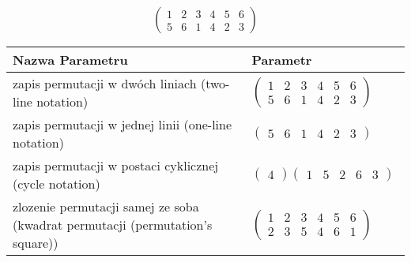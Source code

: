 \documentclass[12pt]{article}
\begin{document}
\subsection{}
\begin{center}
\[
\begin{pmatrix}
	1 & 2 & 3 & 4 & 5 & 6 \\ 
	5 & 6 & 1 & 4 & 2 & 3 
\end{pmatrix}
\]

\begin{tabular}{|m{0.6\linewidth}|m{0.4\linewidth}|}
	\hline
	Nazwa Parametru & Parametr \\
	\hline
	zapis permutacji w dwóch liniach (two-line notation) & $\begin{pmatrix} 1 & 2 & 3 & 4 & 5 & 6 \\ 
5 & 6 & 1 & 4 & 2 & 3 \end{pmatrix}$ \\ 
	\hline
	zapis permutacji w jednej linii (one-line notation) & $\begin{pmatrix} 5 & 6 & 1 & 4 & 2 & 3 \end{pmatrix}$ \\ 
	\hline
	zapis permutacji w postaci cyklicznej (cycle notation) & $\begin{pmatrix} 4 \end{pmatrix} \begin{pmatrix} 1 & 5 & 2 & 6 & 3 \end{pmatrix} $ \\ 
	\hline
	zlozenie permutacji samej ze soba (kwadrat permutacji (permutation's square)) & $\begin{pmatrix} 1 & 2 & 3 & 4 & 5 & 6 \\ 
2 & 3 & 5 & 4 & 6 & 1 \end{pmatrix}$ \\ 
	\hline
\end{tabular}
\end{center}
\end{document}
